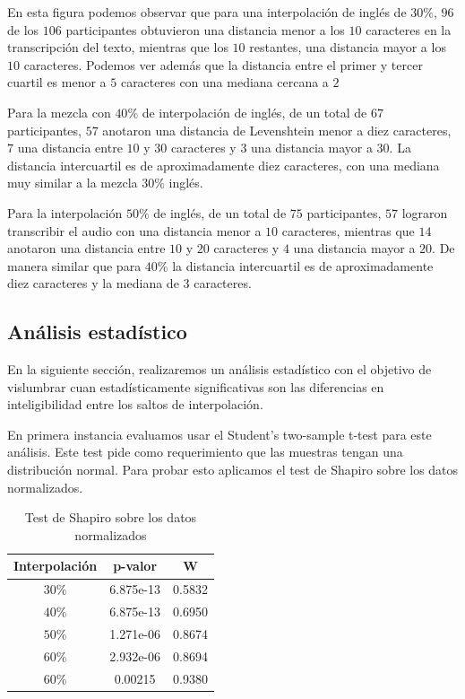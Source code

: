 En esta figura podemos observar que para una interpolación de inglés de $30\%$, $96$ de los $106$ participantes obtuvieron una distancia menor a los $10$ caracteres en la transcripción del texto, mientras que los $10$ restantes, una distancia mayor a los $10$ caracteres. Podemos ver además que la distancia entre el primer y tercer cuartil es menor a $5$ caracteres con una mediana cercana a $2$ 

Para la mezcla con $40\%$ de interpolación de inglés, de un total de $67$ participantes, $57$ anotaron una distancia de Levenshtein menor a diez caracteres, $7$ una distancia entre $10$ y $30$ caracteres y $3$ una distancia mayor a $30$. La distancia intercuartil es de aproximadamente diez caracteres, con una mediana muy similar a la mezcla $30\%$ inglés.

Para la interpolación $50\%$ de inglés, de un total de $75$ participantes, $57$ lograron transcribir el audio con una distancia menor a $10$ caracteres, mientras que $14$ anotaron una distancia entre $10$ y $20$ caracteres y $4$ una distancia mayor a $20$. De manera similar que para $40\%$ la distancia intercuartil es de aproximadamente diez caracteres y la mediana de $3$ caracteres.

\subsection{Análisis estadístico}

En la siguiente sección, realizaremos un análisis estadístico con el objetivo de vislumbrar cuan estadísticamente significativas son las diferencias en inteligibilidad entre los saltos de interpolación.

En primera instancia evaluamos usar el Student's two-sample t-test para este análisis. Este test pide como requerimiento que las muestras tengan una distribución normal. Para probar esto aplicamos el test de Shapiro sobre los datos normalizados.

\begin{table}
\centering
\begin{tabular}[t]{| c | c | c |}
\hline
Interpolación & p-valor & W \\
\hline
\hline
$30\%$ & 6.875e-13 & 0.5832 \\
\hline
$40\%$ & 6.875e-13 & 0.6950 \\
\hline
$50\%$ & 1.271e-06 & 0.8674 \\
\hline
$60\%$ & 2.932e-06 & 0.8694 \\
\hline
$60\%$ & 0.00215 & 0.9380\\

\hline
\end{tabular}
\caption{Test de Shapiro sobre los datos normalizados} 
\label{fig:resultadosShapiro}
\end{table}

